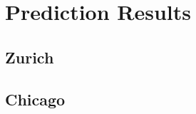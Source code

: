 \chapter{Prediction Results}
\section{Zurich}\label{app:predzh}
\section{Chicago}\label{app:predch}
